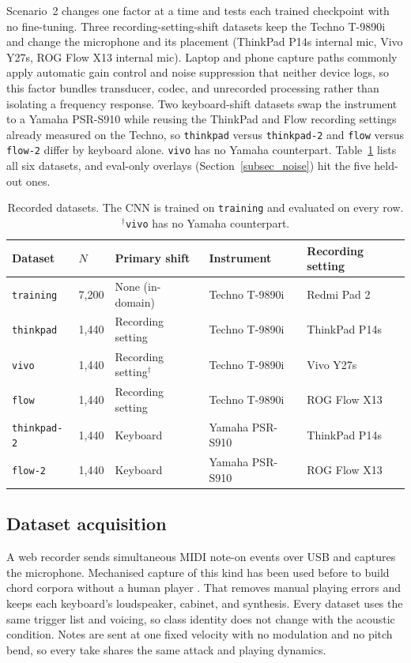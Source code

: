 \documentclass[pdflatex,sn-mathphys-num,iicol]{sn-jnl}
\begin{document}
Scenario~2 changes one factor at a time and tests each trained checkpoint with no fine-tuning. Three recording-setting-shift datasets keep the Techno T-9890i and change the microphone and its placement (ThinkPad P14s internal mic, Vivo Y27s, ROG Flow X13 internal mic). Laptop and phone capture paths commonly apply automatic gain control and noise suppression that neither device logs, so this factor bundles transducer, codec, and unrecorded processing rather than isolating a frequency response. Two keyboard-shift datasets swap the instrument to a Yamaha PSR-S910 while reusing the ThinkPad and Flow recording settings already measured on the Techno, so \texttt{thinkpad} versus \texttt{thinkpad-2} and \texttt{flow} versus \texttt{flow-2} differ by keyboard alone. \texttt{vivo} has no Yamaha counterpart. Table~\ref{tab_datasets} lists all six datasets, and eval-only overlays (Section~\ref{subsec_noise}) hit the five held-out ones.

\begin{table}[t]
\caption{Recorded datasets. The CNN is trained on \texttt{training} and evaluated on every row. $^\dagger$\texttt{vivo} has no Yamaha counterpart.}\label{tab_datasets}
\begin{tabular*}{\textwidth}{@{\extracolsep{\fill}}lllll@{}}
\toprule
Dataset & $N$ & Primary shift & Instrument & Recording setting \\
\midrule
\texttt{training} & 7{,}200 & None (in-domain) & Techno T-9890i & Redmi Pad 2 \\
\texttt{thinkpad} & 1{,}440 & Recording setting & Techno T-9890i & ThinkPad P14s \\
\texttt{vivo} & 1{,}440 & Recording setting$^\dagger$ & Techno T-9890i & Vivo Y27s \\
\texttt{flow} & 1{,}440 & Recording setting & Techno T-9890i & ROG Flow X13 \\
\texttt{thinkpad-2} & 1{,}440 & Keyboard & Yamaha PSR-S910 & ThinkPad P14s \\
\texttt{flow-2} & 1{,}440 & Keyboard & Yamaha PSR-S910 & ROG Flow X13 \\
\bottomrule
\end{tabular*}
\end{table}

\subsection{Dataset acquisition}\label{subsec_acquisition}

A web recorder sends simultaneous MIDI note-on events over USB and captures the microphone. Mechanised capture of this kind has been used before to build chord corpora without a human player \cite{Byambatsogt2020}. That removes manual playing errors and keeps each keyboard's loudspeaker, cabinet, and synthesis. Every dataset uses the same trigger list and voicing, so class identity does not change with the acoustic condition. Notes are sent at one fixed velocity with no modulation and no pitch bend, so every take shares the same attack and playing dynamics.
\end{document}
